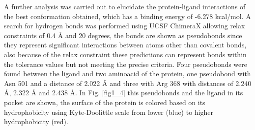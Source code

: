 \documentclass[12pt]{article}
\begin{document}
	A further analysis was carried out to elucidate the protein-ligand interactions of the best conformation obtained, which has a binding energy of -6.278 kcal/mol. A search for hydrogen bonds was performed using UCSF ChimeraX allowing relax constraints of 0.4 \r{A} and 20 degrees, the bonds are shown as pseudobonds since they represent significant interactions between atoms other than covalent bonds, also because of the relax constraint these predictions can represent bonds within the tolerance values but not meeting the precise criteria. \cite{chimera,chimera_2,hbond} Four pseudobonds were found between the ligand and two aminoacid of the protein, one pseudobond with Asn 501 and a distance of 2.022 \r{A} and three with Arg 368 with distances of 2.240 \r{A}, 2.322 \r{A} and 2.438 \r{A}. In Fig. \ref{fig1_4} this pseudobonds and the ligand in its pocket are shown, the surface of the protein is colored based on its hydrophobicity using Kyte-Doolittle scale from lower (blue) to higher hydrophobicity (red).
\end{document}
